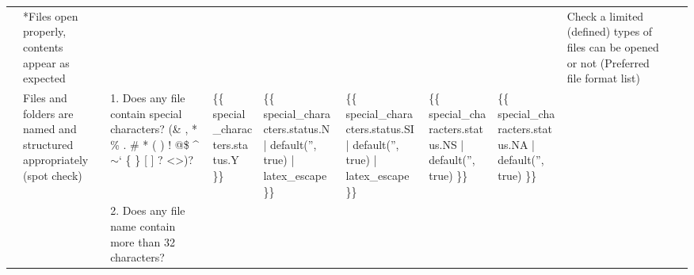 \begin{table}[]
\begin{tabular}{|l|l|l|lllll|l|l|l|}
                                                               & *Files open properly, contents appear as expected                                                                                       &                                                                                                                                              & \multicolumn{1}{l|}{}                                       & \multicolumn{1}{l|}{}                                                                           & \multicolumn{1}{l|}{}                                                                            & \multicolumn{1}{l|}{}                                                            &                                                             & Check a limited (defined) types of files can be opened or not (Preferred file format list) &                                        &                     \\ \cline{2-11} 
                                                               & \multirow{3}{*}{Files and folders are named and structured appropriately (spot check)}                                                  & 1. Does any file contain special characters? (\& , * \% . \# * ( ) ! @\$ \textasciicircum $\sim$‘ \{ \} {[} {]} ? \textless \textgreater{})? & \multicolumn{1}{l|}{\{\{ special\_characters.status.Y \}\}} & \multicolumn{1}{l|}{\{\{ special\_characters.status.N | default('', true) | latex\_escape \}\}} & \multicolumn{1}{l|}{\{\{ special\_characters.status.SI | default('', true) | latex\_escape \}\}} & \multicolumn{1}{l|}{\{\{ special\_characters.status.NS | default('', true) \}\}} & \{\{ special\_characters.status.NA | default('', true) \}\} &                                                                                            &                                        &                     \\ \cline{3-11} 
                                                               &                                                                                                                                         & 2. Does any file name contain more than 32 characters?                                                                                       & \multicolumn{1}{l|}{}                                       & \multicolumn{1}{l|}{}                                                                           & \multicolumn{1}{l|}{}                                                                            & \multicolumn{1}{l|}{}                                                            &                                                             &                                                                                            &                                        &                     \\ \cline{3-11} 

\end{tabular}
\end{table}
